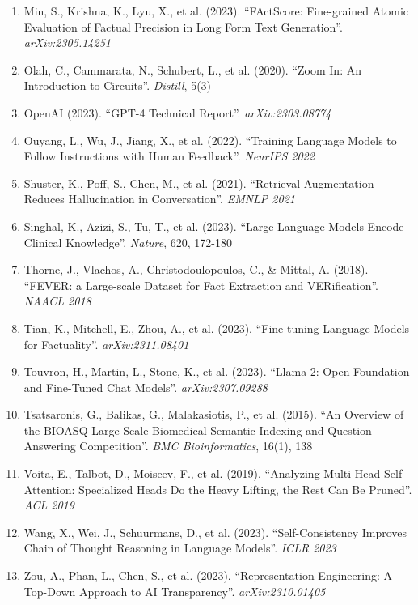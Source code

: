 \documentclass[11pt]{article}
\begin{document}
\begin{enumerate}
    \item Min, S., Krishna, K., Lyu, X., et al. (2023). ``FActScore: Fine-grained Atomic Evaluation of Factual Precision in Long Form Text Generation''. \textit{arXiv:2305.14251}

    \item Olah, C., Cammarata, N., Schubert, L., et al. (2020). ``Zoom In: An Introduction to Circuits''. \textit{Distill}, 5(3)

    \item OpenAI (2023). ``GPT-4 Technical Report''. \textit{arXiv:2303.08774}

    \item Ouyang, L., Wu, J., Jiang, X., et al. (2022). ``Training Language Models to Follow Instructions with Human Feedback''. \textit{NeurIPS 2022}

    \item Shuster, K., Poff, S., Chen, M., et al. (2021). ``Retrieval Augmentation Reduces Hallucination in Conversation''. \textit{EMNLP 2021}

    \item Singhal, K., Azizi, S., Tu, T., et al. (2023). ``Large Language Models Encode Clinical Knowledge''. \textit{Nature}, 620, 172-180

    \item Thorne, J., Vlachos, A., Christodoulopoulos, C., \& Mittal, A. (2018). ``FEVER: a Large-scale Dataset for Fact Extraction and VERification''. \textit{NAACL 2018}

    \item Tian, K., Mitchell, E., Zhou, A., et al. (2023). ``Fine-tuning Language Models for Factuality''. \textit{arXiv:2311.08401}

    \item Touvron, H., Martin, L., Stone, K., et al. (2023). ``Llama 2: Open Foundation and Fine-Tuned Chat Models''. \textit{arXiv:2307.09288}

    \item Tsatsaronis, G., Balikas, G., Malakasiotis, P., et al. (2015). ``An Overview of the BIOASQ Large-Scale Biomedical Semantic Indexing and Question Answering Competition''. \textit{BMC Bioinformatics}, 16(1), 138

    \item Voita, E., Talbot, D., Moiseev, F., et al. (2019). ``Analyzing Multi-Head Self-Attention: Specialized Heads Do the Heavy Lifting, the Rest Can Be Pruned''. \textit{ACL 2019}

    \item Wang, X., Wei, J., Schuurmans, D., et al. (2023). ``Self-Consistency Improves Chain of Thought Reasoning in Language Models''. \textit{ICLR 2023}

    \item Zou, A., Phan, L., Chen, S., et al. (2023). ``Representation Engineering: A Top-Down Approach to AI Transparency''. \textit{arXiv:2310.01405}
\end{enumerate}
\end{document}

